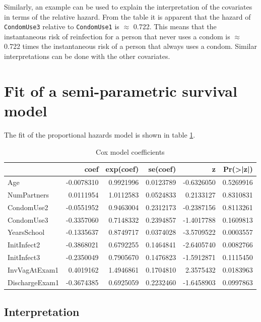 \documentclass[
]{article}
\begin{document}
Similarly, an example can be used to explain the interpretation of the covariates in terms of the relative hazard. From the table it is apparent that the hazard of \texttt{CondomUse3} relative to \texttt{CondomUse1} is \(\approx\) 0.722. This means that the instantaneous risk of reinfection for a person that never uses a condom is \(\approx\) 0.722 times the instantaneous risk of a person that always uses a condom. Similar interpretations can be done with the other covariates.

\hypertarget{fit-of-a-semi-parametric-survival-model}{%
\section{Fit of a semi-parametric survival model}\label{fit-of-a-semi-parametric-survival-model}}

The fit of the proportional hazards model is shown in table \ref{tab:Cox-model}.

\begin{table}

\caption{\label{tab:Cox-model}Cox model coefficients}
\centering
\begin{tabular}[t]{l|r|r|r|r|r}
\hline
  & coef & exp(coef) & se(coef) & z & Pr(>|z|)\\
\hline
Age & -0.0078310 & 0.9921996 & 0.0123789 & -0.6326050 & 0.5269916\\
\hline
NumPartners & 0.0111954 & 1.0112583 & 0.0524833 & 0.2133127 & 0.8310831\\
\hline
CondomUse2 & -0.0551952 & 0.9463004 & 0.2312173 & -0.2387156 & 0.8113261\\
\hline
CondomUse3 & -0.3357060 & 0.7148332 & 0.2394857 & -1.4017788 & 0.1609813\\
\hline
YearsSchool & -0.1335637 & 0.8749717 & 0.0374028 & -3.5709522 & 0.0003557\\
\hline
InitInfect2 & -0.3868021 & 0.6792255 & 0.1464841 & -2.6405740 & 0.0082766\\
\hline
InitInfect3 & -0.2350049 & 0.7905670 & 0.1476823 & -1.5912871 & 0.1115450\\
\hline
InvVagAtExam1 & 0.4019162 & 1.4946861 & 0.1704810 & 2.3575432 & 0.0183963\\
\hline
DischargeExam1 & -0.3674385 & 0.6925059 & 0.2232460 & -1.6458903 & 0.0997863\\
\hline
\end{tabular}
\end{table}

\hypertarget{interpretation-1}{%
\subsection{Interpretation}\label{interpretation-1}}
\end{document}
